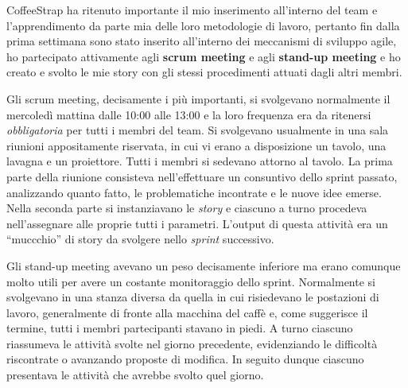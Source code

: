 CoffeeStrap ha ritenuto importante il mio inserimento all'interno del team e l'apprendimento da parte mia delle loro metodologie di lavoro, pertanto fin dalla prima settimana sono stato inserito all'interno dei meccanismi di sviluppo agile, ho partecipato attivamente agli \textbf{scrum meeting} e agli \textbf{stand-up meeting} e ho creato e svolto le mie story con gli stessi procedimenti attuati dagli altri membri. 

Gli scrum meeting, decisamente i più importanti, si svolgevano normalmente il mercoledì mattina dalle 10:00 alle 13:00 e la loro frequenza era da ritenersi \textit{obbligatoria} per tutti i membri del team. Si svolgevano usualmente in una sala riunioni appositamente riservata, in cui vi erano a disposizione un tavolo, una lavagna e un proiettore. Tutti i membri si sedevano attorno al tavolo. La prima parte della riunione consisteva nell'effettuare un consuntivo dello sprint passato, analizzando quanto fatto, le problematiche incontrate e le nuove idee emerse. Nella seconda parte si instanziavano le \textit{story} e ciascuno a turno procedeva nell'assegnare alle proprie tutti i parametri. L'output di questa attività era un ``muccchio'' di story da svolgere nello \textit{sprint} successivo.

Gli stand-up meeting avevano un peso decisamente inferiore ma erano comunque molto utili per avere un costante monitoraggio dello sprint. Normalmente si svolgevano in una stanza diversa da quella in cui risiedevano le postazioni di lavoro, generalmente di fronte alla macchina del caffè e, come suggerisce il termine, tutti i membri partecipanti stavano in piedi. A turno ciascuno riassumeva le attività svolte nel giorno precedente, evidenziando le difficoltà riscontrate o avanzando proposte di modifica. In seguito dunque ciascuno presentava le attività che avrebbe svolto quel giorno.


